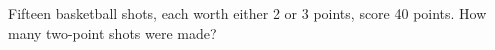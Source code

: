 Fifteen basketball shots, each worth either 2 or 3 points, score 40 points. How many two-point shots were made?
